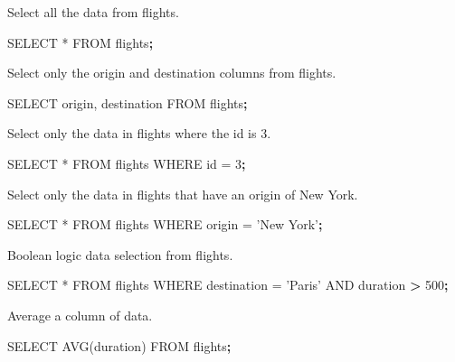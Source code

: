 \documentclass[]{book}
\newenvironment{Shaded}{\begin{snugshade}}{\end{snugshade}}
\newcommand{\KeywordTok}[1]{\textcolor[rgb]{0.13,0.29,0.53}{\textbf{#1}}}
\newcommand{\StringTok}[1]{\textcolor[rgb]{0.31,0.60,0.02}{#1}}
\newcommand{\OperatorTok}[1]{\textcolor[rgb]{0.81,0.36,0.00}{\textbf{#1}}}
\newcommand{\ExtensionTok}[1]{#1}
\newcommand{\NormalTok}[1]{#1}
\begin{document}
Select all the data from flights.

\begin{Shaded}
\begin{Highlighting}[]
\ExtensionTok{SELECT}\NormalTok{ * FROM flights}\KeywordTok{;}
\end{Highlighting}
\end{Shaded}

Select only the origin and destination columns from flights.

\begin{Shaded}
\begin{Highlighting}[]
\ExtensionTok{SELECT}\NormalTok{ origin, destination FROM flights}\KeywordTok{;}
\end{Highlighting}
\end{Shaded}

Select only the data in flights where the id is 3.

\begin{Shaded}
\begin{Highlighting}[]
\ExtensionTok{SELECT}\NormalTok{ * FROM flights WHERE id = 3}\KeywordTok{;}
\end{Highlighting}
\end{Shaded}

Select only the data in flights that have an origin of New York.

\begin{Shaded}
\begin{Highlighting}[]
\ExtensionTok{SELECT}\NormalTok{ * FROM flights WHERE origin = }\StringTok{'New York'}\KeywordTok{;}
\end{Highlighting}
\end{Shaded}

Boolean logic data selection from flights.

\begin{Shaded}
\begin{Highlighting}[]
\ExtensionTok{SELECT}\NormalTok{ * FROM flights WHERE destination = }\StringTok{'Paris'}\NormalTok{ AND duration }\OperatorTok{>}\NormalTok{ 500}\KeywordTok{;}
\end{Highlighting}
\end{Shaded}

Average a column of data.

\begin{Shaded}
\begin{Highlighting}[]
\ExtensionTok{SELECT}\NormalTok{ AVG(duration) }\ExtensionTok{FROM}\NormalTok{ flights}\KeywordTok{;}
\end{Highlighting}
\end{Shaded}
\end{document}
